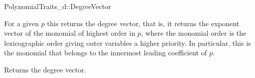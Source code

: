 \begin{ccRefConcept}{PolynomialTraits_d::DegreeVector}

\ccDefinition

For a given  $p$ 
this  returns the degree vector, that is, 
it returns the exponent vector of the monomial of highest order in $p$, 
where the monomial order is the lexicographic order giving outer 
variables a higher priority. In particular, this is the monomial 
that belongs to the innermost leading coefficient of $p$.  

\ccRefines 
{}


\ccTypes


\ccGlue
{}

\ccOperations
{}
         {Returns the degree vector.}


\ccSeeAlso

\\
\\
\\
\\
\\

\end{ccRefConcept}

